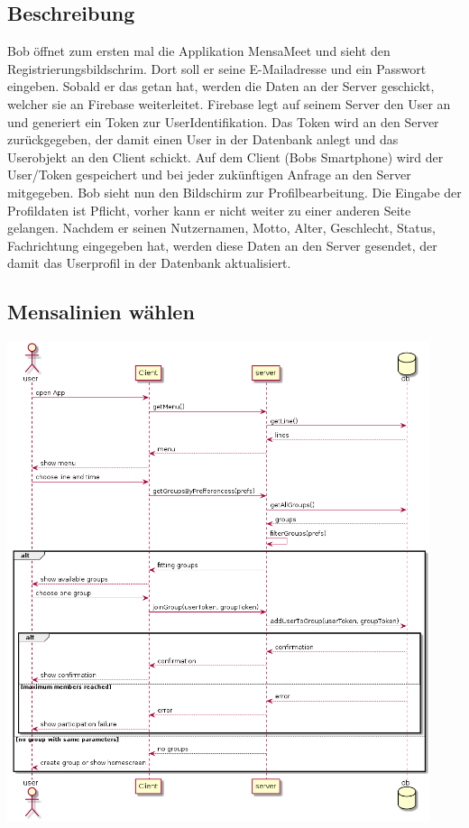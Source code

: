 \documentclass[a4paper]{scrreprt}
\begin{document}
\subsection*{Beschreibung}
Bob öffnet zum ersten mal die Applikation MensaMeet und sieht den Registrierungsbildschrim. Dort soll er seine E-Mailadresse und ein Passwort eingeben. Sobald er das getan hat, werden die Daten an der Server geschickt, welcher sie an Firebase weiterleitet. Firebase legt auf seinem Server den User an und generiert ein Token zur UserIdentifikation. Das Token wird an den Server zurückgegeben, der damit einen User in der Datenbank anlegt und das Userobjekt an den Client schickt. Auf dem Client (Bobs Smartphone) wird der User/Token gespeichert und bei jeder zukünftigen Anfrage an den Server mitgegeben. 
Bob sieht nun den Bildschirm zur Profilbearbeitung. Die Eingabe der Profildaten ist Pflicht, vorher kann er nicht weiter zu einer anderen Seite gelangen.
Nachdem er seinen Nutzernamen, Motto, Alter, Geschlecht, Status, Fachrichtung eingegeben hat, werden diese Daten an den Server gesendet, der damit das Userprofil in der Datenbank aktualisiert. 
\newpage
\subsection{Mensalinien wählen}
\begin{center}
	\includegraphics[width=0.93\textwidth]{Sequenzdiagramme/chooseLineAndTimeSD.png}
\end{center}
\end{document}
